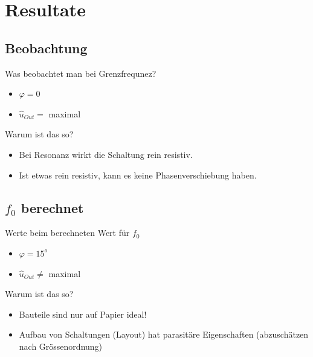\section{Resultate}

\subsection{Beobachtung}
\begin{frame}
	\begin{block}{Was beobachtet man bei Grenzfrequnez?}
		\begin{itemize}
			\item{$\varphi = 0$}
			\item{$\hat u_{Out} =$ maximal}
		\end{itemize}
	\end{block}
	\begin{exampleblock}{Warum ist das so?}
		\begin{itemize}
			\item Bei Resonanz wirkt die Schaltung rein resistiv.
			\item Ist etwas rein resistiv, kann es keine 
				Phasenverschiebung haben.
		\end{itemize}
	\end{exampleblock}
\end{frame}

\subsection{$f_0$ berechnet}
\begin{frame}
	\begin{block}{Werte beim berechneten Wert für $f_0$}
		\begin{itemize}
			\item $\varphi = 15^o$
			\item $\hat u_{Out} \neq$ maximal
		\end{itemize}
	\end{block}
	\begin{alertblock}{Warum ist das so?}
		\begin{itemize}
			\item Bauteile sind nur auf Papier ideal!
			\item Aufbau von Schaltungen (Layout) hat parasitäre
				Eigenschaften (abzuschätzen nach Grössenordnung)
		\end{itemize}
	\end{alertblock}
\end{frame}

